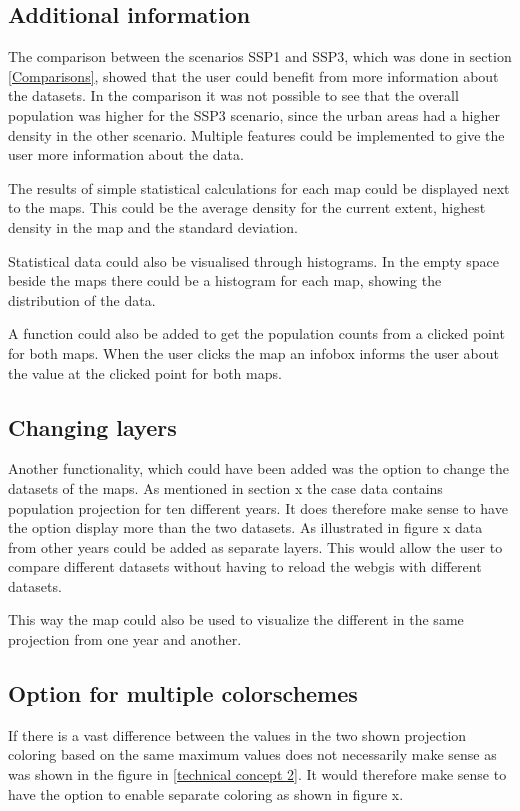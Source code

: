 \subsection{Additional information}\label{MoreInfoPlz}

The comparison between the scenarios SSP1 and SSP3, which was done in section \ref{Comparisons}, showed that the user could benefit from more information about the datasets. In the comparison it was not possible to see that the overall population was higher for the SSP3 scenario, since the urban areas had a higher density in the other scenario. Multiple features could be implemented to give the user more information about the data.

The results of simple statistical calculations for each map could be displayed next to the maps. This could be the average density for the current extent, highest density in the map and the standard deviation.

Statistical data could also be visualised through histograms. In the empty space beside the maps there could be a histogram for each map, showing the distribution of the data. 

A function could also be added to get the population counts from a clicked point for both maps. When the user clicks the map an infobox informs the user about the value at the clicked point for both maps. 





\subsection{Changing layers}
Another functionality, which could have been added was the option to change the datasets of the maps. As mentioned in section x the case data contains population projection for ten different years. It does therefore make sense to have the option display more than the two datasets.  As illustrated in figure x data from other years could be added as separate layers. This would allow the user to compare different datasets without having to reload the webgis with different datasets.

This way the map could also be used to visualize the different in the same projection from one year and another.
\subsection{Option for multiple colorschemes}
If there is a vast difference between the values in the two shown projection coloring based on the same maximum values does not necessarily make sense as was shown in the figure in \ref{technical concept 2}. It would therefore make sense to have the option to enable separate coloring as shown in figure x. 



